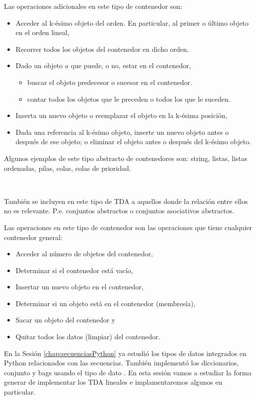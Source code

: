 Las operaciones adicionales en este tipo de contenedor son:

\begin{itemize}
\item Acceder al k-ésimo objeto del orden. En particular, al primer o último objeto en el orden lineal,
\item Recorrer todos los objetos del contenedor en dicho orden.
\item Dado un objeto $a$ que puede, o no,  estar en el contenedor, 
	\begin{itemize}
	\item buscar el objeto predecesor o sucesor en el contenedor.
	\item contar todos los objetos que le preceden o todos los que le suceden.
	\end{itemize}
\item Inserta un nuevo objeto o reemplazar el objeto en la k-ésima posición,
\item Dada una referencia al k-ésimo objeto, inserte un nuevo objeto antes o después de ese objeto; o eliminar el objeto antes o después del k-ésimo objeto.
\end{itemize}

Algunos ejemplos de este tipo abstracto de contenedores son: string, listas, listas ordenadas, pilas, colas, colas de prioridad.

\

También se incluyen en este tipo de TDA a aquellos donde la relación entre ellos no es relevante. P.e. conjuntos abstractos o conjuntos asociativos abstractos.

Las operaciones en este tipo de contenedor son las operaciones que tiene cualquier  contenedor general:

\begin{itemize}
\item Acceder al número de objetos del contenedor,
\item Determinar si el contenedor está vacío,
\item Insertar un nuevo objeto en el contenedor,
\item Determinar si un objeto está en el contenedor (membresía),
\item Sacar un objeto del contenedor y
\item Quitar todos los datos (limpiar) del contenedor.
\end{itemize}


En la Sesión \ref{chap:secuenciasPython} ya estudió los tipos de datos integrados en Python relacionados con las secuencias. También implementó los diccionarios, conjunto y bags usando el tipo de dato . En esta sesión vamos a estudiar la forma generar de implementar los TDA lineales e implamentaremos algunos en particular.



